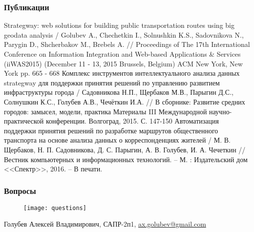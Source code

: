 \begin{frame}
    \frametitle{Публикации}
    \scriptsize
    \begin{thebibliography}{10}
         Strategway: web solutions for building public transportation routes using big geodata 
            analysis / Golubev A., Chechetkin I., Solnushkin K.S., Sadovnikova N., Parygin D., Shcherbakov M., 
            Brebels A. // Proceedings of The 17th International Conference on Information Integration and 
            Web-based Applications \& Services (iiWAS2015) (December 11 - 13, 2015 Brussels, Belgium) 
            ACM New York, New York pp. 665 - 668
         Комплекс инструментов интеллектуального анализа данных strategway для поддержки 
            принятия решений по управлению развитием инфраструктуры города / Садовникова Н.П., Щербаков М.В., 
            Парыгин Д.С., Солнушкин К.С., Голубев А.В., Чечёткин И.А. // В сборнике: Развитие средних 
            городов: замысел, модели, практика Материалы III Международной научно-практической конференции. 
            Волгоград, 2015. С. 147-150
         Автоматизация поддержки принятия решений по разработке маршрутов общественного 
            транспорта на основе анализа данных о корреспонденциях жителей / М. В. Щербаков, 
            Н. П. Садовникова, Д. С. Парыгин, А. В. Голубев, И. А. Чечеткин // Вестник компьютерных и 
            информационных технологий. -- М. : Издательский дом <<Спектр>>, 2016. -- В печати.
    \end{thebibliography}
\end{frame}

\begin{frame}
    \frametitle{Вопросы}
    \begin{minipage}{0.3\textwidth}
        \begin{figure}[ht!]
            \centering
            \texttt{[image: questions]}
        \end{figure}
    \end{minipage}
    \begin{minipage}{0.6\textwidth}
        \begin{center}
            Голубев Алексей Владимирович, САПР-2п1,
            \href{mailto:ax.golubev@gmail.com}{ax.golubev@gmail.com}
        \end{center}
    \end{minipage}
\end{frame}